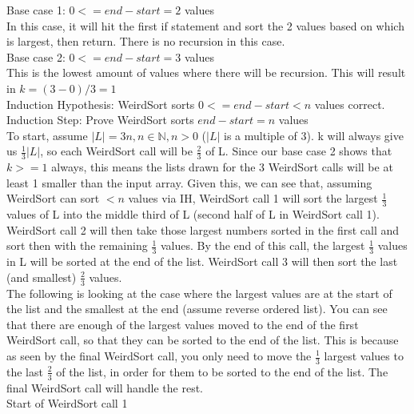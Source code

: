 \begin{problem}
\begin{questions}
Base case 1: $0<= end - start = 2$ values\\
In this case, it will hit the first if statement and sort the 2 values based on which is largest, then return. There is no recursion in this case.\\

Base case 2: $0<= end - start = 3$ values\\
This is the lowest amount of values where there will be recursion. This will result in $k = (3-0)/3 = 1$\\
Induction Hypothesis: WeirdSort sorts $0<= end - start < n$ values correct.\\
Induction Step: Prove WeirdSort sorts $end - start = n$ values\\

To start, assume $|L| = 3n, n \in \mathbb{N}, n > 0$ ($|L|$ is a multiple of 3). k will always give us $\frac{1}{3} |L|$, so each WeirdSort call will be $\frac{2}{3}$ of L. Since our base case 2 shows that $k>=1$ always, this means the lists drawn for the 3 WeirdSort calls will be at least 1 smaller than the input array. Given this, we can see that, assuming WeirdSort can sort $<n$ values via IH, WeirdSort call 1 will sort the largest $\frac{1}{3}$ values of L into the middle third of L (second half of L in WeirdSort call 1). WeirdSort call 2 will then take those largest numbers sorted in the first call and sort then with the remaining $\frac{1}{3}$ values. By the end of this call, the largest $\frac{1}{3}$ values in L will be sorted at the end of the list. WeirdSort call 3 will then sort the last (and smallest) $\frac{2}{3}$ values.\\

The following is looking at the case where the largest values are at the start of the list and the smallest at the end (assume reverse ordered list). You can see that there are enough of the largest values moved to the end of the first WeirdSort call, so that they can be sorted to the end of the list. This is because as seen by the final WeirdSort call, you only need to move the $\frac{1}{3}$ largest values to the last $\frac{2}{3}$ of the list, in order for them to be sorted to the end of the list. The final WeirdSort call will handle the rest.\\

Start of WeirdSort call 1\\
\end{questions}
\end{problem}
